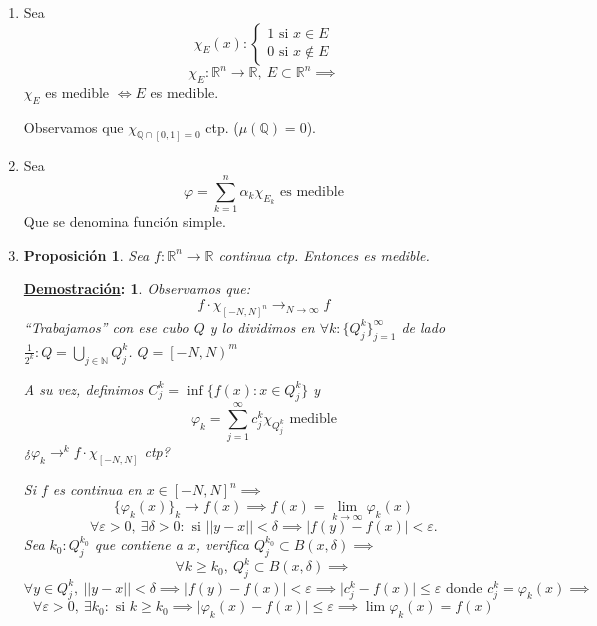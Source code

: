 \documentclass[10pt,a4paper,openright]{book}
\theoremstyle{break}
\newtheorem*{prop}{Proposición}
\newtheorem*{demo}{\underline{Demostración}:}
\begin{document}
\begin{enumerate}
\item Sea 
$$\chi_E \left(x\right) : \begin{cases}
    1 \text{ si } x \in E\\
    0 \text{ si } x \not\in E
\end{cases}$$
$$\chi_E: \mathbb{R}^{n} \to \mathbb{R},\ E \subset \mathbb{R}^n \implies$$
$\chi_E$ es medible $\iff E$ es medible.

Observamos que $\chi_{\mathbb{Q} \cap \left[0, 1\right] = 0}$ ctp. ($\mu\left(\mathbb{Q}\right) = 0$).
\item Sea 
$$\varphi = \sum_{k=1}^{n} \alpha_k \chi_{E_k} \text{ es medible}$$
Que se denomina función simple.
\item 
\begin{prop}
Sea $f: \mathbb{R}^n \to \mathbb{R}$ continua ctp. Entonces es medible.
\end{prop}
\begin{demo}
Observamos que: 
$$f\cdot \chi_{\left[-N, N\right]^{n}} \to_{N \to \infty} f$$
``Trabajamos'' con ese cubo $Q$ y lo dividimos en $\forall k: \{Q_j^k\}_{j=1}^{\infty}$ de lado $\frac{1}{2^k}: Q = \bigcup_{j \in \mathbb{N}} Q_j^k$. $Q = \left[-N, N\right)^{m}$

A su vez, definimos $C_j^k = \inf \{f\left(x\right): x \in Q_j^k\}$ y 
$$\varphi_k = \sum_{j = 1}^{\infty} c_j^k \chi_{Q_j^k} \text{ medible}$$
¿$\varphi_k \to^k f\cdot \chi_{\left[-N, N\right]}$ ctp?

Si $f$ es continua en $x  \in \left[-N, N\right]^n\implies$
$$\{\varphi_k\left(x\right)\}_k \to f\left(x\right) \implies f\left(x\right) = \lim_{k \to \infty}\varphi_k\left(x\right)$$
$$\forall \varepsilon > 0,\ \exists \delta > 0: \text{ si } \vert\vert y - x \vert\vert < \delta \implies \vert f\left(y\right) - f\left(x\right)\vert < \varepsilon.$$
Sea $k_0: Q_j^{k_0}$ que contiene a $x$, verifica $Q_j^{k_0} \subset B\left(x, \delta\right) \implies$
$$\forall k \ge k_0,\ Q_j^k \subset B\left(x, \delta\right) \implies$$
$$\forall y \in Q_j^k,\ \vert\vert y - x\vert\vert < \delta \implies \vert f\left(y\right) - f\left(x\right) \vert < \varepsilon \implies \vert c_j^k - f\left(x\right) \vert \le \varepsilon \text{ donde } c_j^k = \varphi_k\left(x\right) \implies$$
$$\forall \varepsilon > 0,\ \exists k_0: \text{ si } k \ge k_0 \implies \vert \varphi_k\left(x\right) - f\left(x\right) \vert \le \varepsilon \implies \lim \varphi_k\left(x\right) = f\left(x\right)$$
\end{demo}
\end{enumerate}
\end{document}
